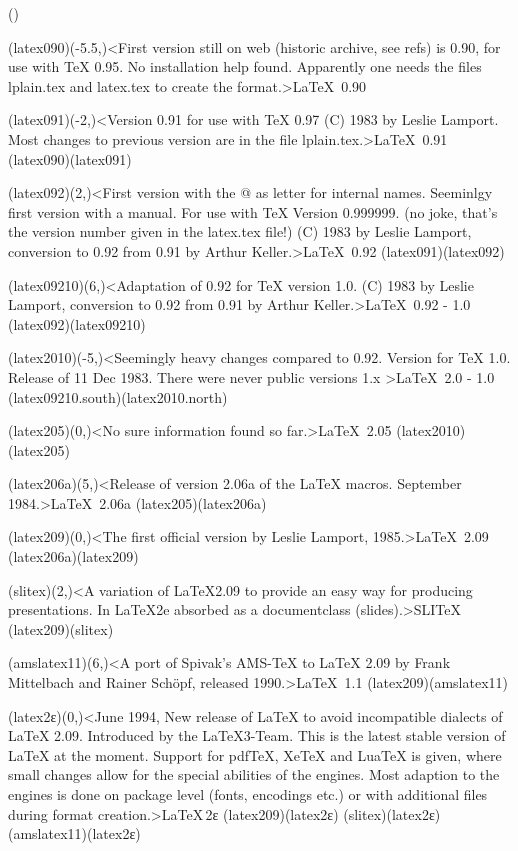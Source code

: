 \tograph*(){

	\tonode(latex090)(-5.5,\layer)<First version still on web (historic archive, see refs) is 0.90, for use with TeX 0.95. No installation help found. Apparently one needs the files lplain.tex and latex.tex to create the format.>{\LaTeX\ 0.90}
	
	\tonode(latex091)(-2,\layer)<Version 0.91 for use with TeX 0.97 (C) 1983 by Leslie Lamport. Most changes to previous version are in the file lplain.tex.>{\LaTeX\ 0.91}
	\todraw(latex090)(latex091)
	
	\tonode(latex092)(2,\layer)<First version with the @ as letter for internal names. Seeminlgy first version with a manual. For use with TeX Version 0.999999. (no joke, that's the version number given in the latex.tex file!) (C) 1983 by Leslie Lamport, conversion to 0.92 from 0.91 by Arthur Keller.>{\LaTeX\ 0.92}
	\todraw(latex091)(latex092)

	\tonode(latex09210)(6,\layer)<Adaptation of 0.92 for TeX version 1.0. (C) 1983 by Leslie Lamport, conversion to 0.92 from 0.91 by Arthur Keller.>{\LaTeX\ 0.92 - 1.0}
	\todraw(latex092)(latex09210)
	\steplayer[-2.3]

	\tonode(latex2010)(-5,\layer)<Seemingly heavy changes compared to 0.92. Version for TeX 1.0. Release of 11 Dec 1983. There were never public versions 1.x >{\LaTeX\ 2.0 - 1.0}
	\todraw(latex09210.south)(latex2010.north)
	
	\tonode(latex205)(0,\layer)<No sure information found so far.>{\LaTeX\ 2.05}
	\todraw(latex2010)(latex205)
	
	\tonode(latex206a)(5,\layer)<Release of version 2.06a of the LaTeX macros. September 1984.>{\LaTeX\ 2.06a}
	\todraw(latex205)(latex206a)
	
	\steplayer[-2.5]
	\tonode[\vip](latex209)(0,\layer)<The first official version by Leslie Lamport, 1985.>{\LaTeX\ 2.09}
	\todraw(latex206a)(latex209)
	
	\steplayer[-2]
	\tonode(slitex)(2,\layer)<A variation of LaTeX2.09 to provide an easy way for producing presentations. In LaTeX2e absorbed as a documentclass (slides).>{SLI\TeX}
	\todraw(latex209)(slitex)
	
	\tonode(amslatex11)(6,\layer)<A port of Spivak's AMS-TeX to LaTeX 2.09 by Frank Mittelbach and Rainer Schöpf, released 1990.>{\AMS\LaTeX\ 1.1}
	\todraw(latex209)(amslatex11)
	
	\steplayer[-1.7]
	\tonode[\vip](latex2ε)(0,\layer)<June 1994, New release of LaTeX to avoid incompatible dialects of LaTeX 2.09. Introduced by the LaTeX3-Team. This is the latest stable version of LaTeX at the moment. Support for pdfTeX, XeTeX and LuaTeX is given, where small changes allow for the special abilities of the engines. Most adaption to the engines is done on package level (fonts, encodings etc.) or with additional files during format creation.>{\LaTeX\,2\raisebox{-.5ex}ε}
	\todraw*(latex209)(latex2ε)
	\todraw[dashed](slitex)(latex2ε)
	\todraw[dashed](amslatex11)(latex2ε)

}
